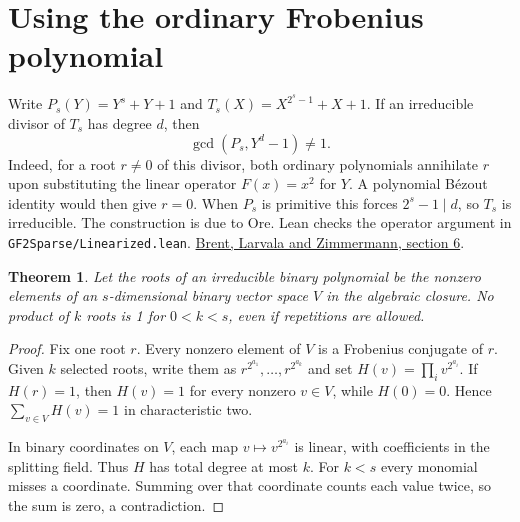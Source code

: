\documentclass[11pt]{article}
\newtheorem{theorem}{Theorem}
\begin{document}
\section{Using the ordinary Frobenius polynomial}

Write \(P_s(Y)=Y^s+Y+1\) and \(T_s(X)=X^{2^s-1}+X+1\).
If an irreducible divisor of \(T_s\) has degree \(d\), then
\[
                        \gcd(P_s,Y^d-1)\ne1.
\]
Indeed, for a root \(r\ne0\) of this divisor, both ordinary polynomials
annihilate \(r\) upon substituting the linear operator \(F(x)=x^2\)
for \(Y\). A polynomial Bézout identity would then give \(r=0\).
When \(P_s\) is primitive this forces \(2^s-1\mid d\), so \(T_s\)
is irreducible. The construction is due to Ore. Lean checks the
operator argument in \texttt{GF2Sparse/Linearized.lean}.
\href{https://maths-people.anu.edu.au/~brent/pd/rpb199.pdf\#page=8}
{Brent, Larvala and Zimmermann, section 6}.

\begin{theorem}\label{thm:additive-orbit}
Let the roots of an irreducible binary polynomial be the nonzero
elements of an \(s\)-dimensional binary vector space \(V\) in the
algebraic closure. No product of \(k\) roots is 1 for \(0<k<s\),
even if repetitions are allowed.
\end{theorem}
\begin{proof}
Fix one root \(r\). Every nonzero element of \(V\) is a Frobenius
conjugate of \(r\). Given \(k\) selected roots, write them as
\(r^{2^{a_1}},\ldots,r^{2^{a_k}}\) and set
\(H(v)=\prod_i v^{2^{a_i}}\). If \(H(r)=1\), then
\(H(v)=1\) for every nonzero \(v\in V\), while \(H(0)=0\).
Hence \(\sum_{v\in V} H(v)=1\) in characteristic two.

In binary coordinates on \(V\), each map \(v\mapsto v^{2^{a_i}}\)
is linear, with coefficients in the splitting field. Thus \(H\) has
total degree at most \(k\). For \(k<s\) every monomial misses a
coordinate. Summing over that coordinate counts each value twice,
so the sum is zero, a contradiction.
\end{proof}
\end{document}
